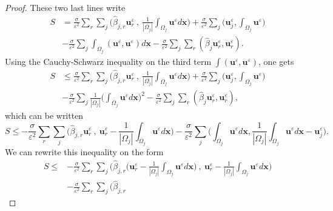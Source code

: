 \documentclass[a4paper,french,english,10pt]{article}
\newcommand\uu{\mathbf{u}}
\newcommand\eps{\varepsilon}
\newcommand\x{\mathbf{x}}
\newcommand\uj{\uu_j}
\begin{document}
\begin{proof}
These two last lines 
write 
\begin{equation*}
\begin{aligned}
S &= \frac{\sigma}{\eps^2} \sum_r \sum_j  \bigg(
\widehat{\beta}_{j,r}\textbf{u}_r^{\eps}  \: , \:
\frac{1}{|\Omega_j|}\int_{\Omega_j} \textbf{u}^{\eps} d\x \bigg)
+\frac{\sigma}{\eps^2}\sum_j\bigg(  \textbf{u}_j^{\eps} ,
\int_{\Omega_j}\textbf{u}^{\eps} \bigg) \\
&-\frac{\sigma}{\eps^2}\sum_j\int_{\Omega_j}(\textbf{u}^{\eps},\textbf{u}^{\eps}
)d\x -\frac{\sigma}{\eps^2}\sum_{j}\sum_{r}
(\widehat{\beta}_{j}
\textbf{u}_r^{\eps},\textbf{u}_r^{\eps}).
\end{aligned}
\end{equation*}
Using the Cauchy-Schwarz inequality on the third term
 $\int (\textbf{u}^{\eps},\textbf{u}^{\eps})$, one gets
\begin{equation*}
\begin{aligned}
S &\leq \frac{\sigma}{\eps^2} \sum_r \sum_j  \bigg(
\widehat{\beta}_{j,r}\textbf{u}_r^{\eps}  \: , \:
\frac{1}{|\Omega_j|}\int_{\Omega_j} \uu^{\eps}d\x \bigg) +\frac{\sigma}{\eps^2}\sum_j\bigg(  \textbf{u}_j^{\eps} ,
\int_{\Omega_j}\textbf{u}^{\eps} \bigg) \\
&- \frac{\sigma}{\eps^2}\sum_j \frac{1}{|\Omega_j|}\bigg(
\int_{\Omega_j}\textbf{u}^{\eps}d\x \bigg)^2 -\frac{\sigma}{\eps^2}\sum_{j}
\sum_{r}
(\widehat{\beta}_{j}    
\textbf{u}_r^{\eps},\textbf{u}_r^{\eps}),
\end{aligned}
\end{equation*}
which can be written
\begin{equation*}
S \leq -\frac{\sigma}{\eps^2} \sum_r \sum_j  \bigg(
\widehat{\beta}_{j,r}\textbf{u}_r^{\eps}  \: , \:
\textbf{u}_r^{\eps}-\frac{1}{|\Omega_j|}\int_{\Omega_j} \textbf{u}^{\eps} d\x
\bigg) - \frac{\sigma}{\eps^2}\sum_j\bigg( \int_{\Omega_j}\textbf{u}^{\eps}d\x ,
 \frac{1}{|\Omega_j|}  \int_{\Omega_j}\textbf{u}^{\eps}d\x -\uj^{\eps}
\bigg) .
\end{equation*}
We can rewrite this inequality on the form
\begin{equation*}
\begin{aligned}
S \leq &-\frac{\sigma}{\eps^2} \sum_r \sum_j  \bigg( \widehat{\beta}_{j,r}\bigg(
\textbf{u}_r^{\eps}- \frac{1}{|\Omega_j|}\int_{\Omega_j} \textbf{u}^{\eps} d\x\bigg) 
\: , \: \textbf{u}_r^{\eps}-\frac{1}{|\Omega_j|}\int_{\Omega_j}
\textbf{u}^{\eps} d\x \bigg) \\
&-\frac{\sigma}{\eps^2} \sum_r \sum_j  \bigg( \widehat{\beta}_{j,r}

\end{aligned}
\end{equation*}
\end{proof}
\end{document}
